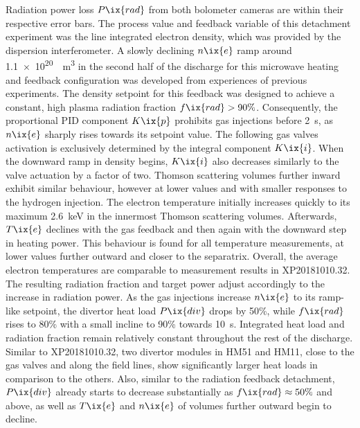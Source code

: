                 Radiation power loss $P\ix{rad}$ from both bolometer cameras are within their respective error bars. The process value and feedback variable of this detachment experiment was the line integrated electron density, which was provided by the dispersion interferometer. A slowly declining $n\ix{e}$ ramp around \SI[per-mode=reciprocal]{1.1e20}{\per\cubic\meter} in the second half of the discharge for this microwave heating and feedback configuration was developed from experiences of previous experiments. The density setpoint for this feedback was designed to achieve a constant, high plasma radiation fraction $f\ix{rad}>90\%$\cite{Krychowiak2021, Krychowiak2023}. Consequently, the proportional PID component $K\ix{p}$ prohibits gas injections before \SI{2}{\second}, as $n\ix{e}$ sharply rises towards its setpoint value. The following gas valves activation is exclusively determined by the integral component $K\ix{i}$. When the downward ramp in density begins, $K\ix{i}$ also decreases similarly to the valve actuation by a factor of two. Thomson scattering volumes further inward exhibit similar behaviour, however at lower values and with smaller responses to the hydrogen injection. The electron temperature initially increases quickly to its maximum \SI{2.6}{\kilo\electronvolt} in the innermost Thomson scattering volumes. Afterwards, $T\ix{e}$ declines with the gas feedback and then again with the downward step in heating power. This behaviour is found for all temperature measurements, at lower values further outward and closer to the separatrix. Overall, the average electron temperatures are comparable to measurement results in XP20181010.32.\\%
                The resulting radiation fraction and target power adjust accordingly to the increase in radiation power. As the gas injections increase $n\ix{e}$ to its ramp-like setpoint, the divertor heat load $P\ix{div}$ drops by 50\%, while $f\ix{rad}$ rises to 80\% with a small incline to 90\% towards \SI{10}{\second}. Integrated heat load and radiation fraction remain relatively constant throughout the rest of the discharge. Similar to XP20181010.32, two divertor modules in HM51 and HM11, close to the gas valves and along the field lines, show significantly larger heat loads in comparison to the others. Also, similar to the radiation feedback detachment, $P\ix{div}$ already starts to decrease substantially as $f\ix{rad}\approx50\%$ and above, as well as $T\ix{e}$ and $n\ix{e}$ of volumes further outward begin to decline.\\%
